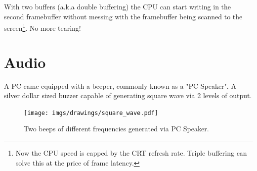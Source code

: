 \documentclass[book.tex]{subfiles}
\begin{document}
\par
With two buffers (a.k.a double buffering) the CPU can start writing in the second framebuffer without messing with the framebuffer being scanned to the screen\footnote{Now the CPU speed is capped by the CRT refresh rate. Triple buffering can solve this at the price of frame latency.}. No more tearing!
















\section{Audio}
A PC came equipped with a beeper, commonly known as a "PC Speaker". A silver dollar sized buzzer capable of generating square wave via 2 levels of output.\\
\par
 \begin{figure}[H]
\centering
\texttt{[image: imgs/drawings/square\_wave.pdf]}
\caption{Two beeps of different frequencies generated via PC Speaker.}
\end{figure}
\end{document}
